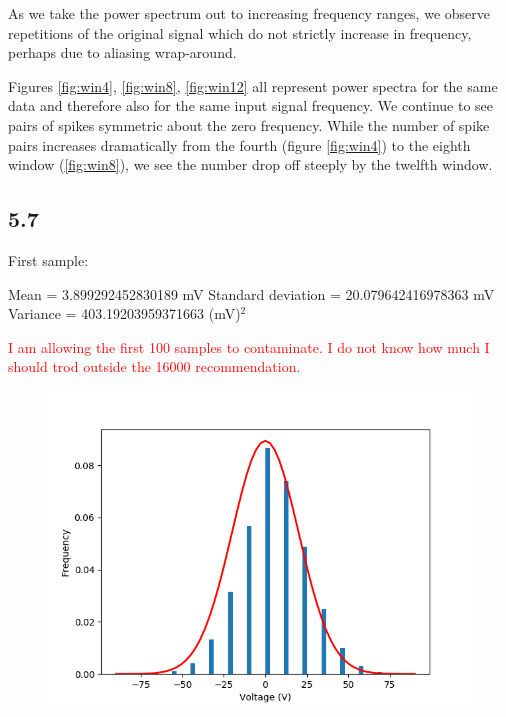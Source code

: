 \documentclass[a4paper]{article}
\begin{document}
As we take the power spectrum out to increasing frequency ranges, we observe repetitions of the original signal which do not strictly increase in frequency, perhaps due to aliasing wrap-around.

Figures \ref{fig:win4}, \ref{fig:win8}, \ref{fig:win12} all represent power spectra for the same data and therefore also for the same input signal frequency. We continue to see pairs of spikes symmetric about the zero frequency. While the number of spike pairs increases dramatically from the fourth (figure \ref{fig:win4}) to the eighth window (\ref{fig:win8}), we see the number drop off steeply by the twelfth window. %


\subsection{5.7}

First sample:

Mean = 3.899292452830189 mV
Standard deviation = 20.079642416978363 mV
Variance = 403.19203959371663 (mV)$^2$

\textcolor{red}{I am allowing the first 100 samples to contaminate. I do not know how much I should trod outside the 16000 recommendation.}

\begin{figure}
\centering
\includegraphics[width=.45\linewidth]{5-7/histo}
\caption{}
\label{fig:histogram}
\end{figure}
\end{document}

